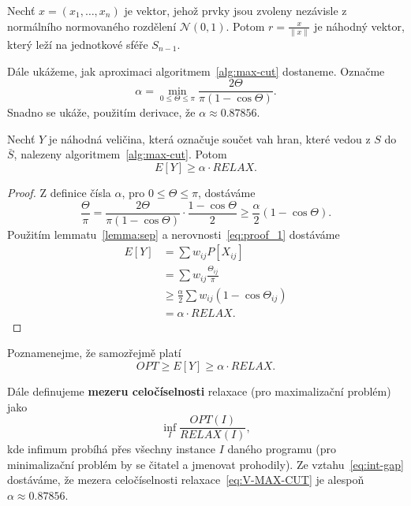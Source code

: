 \begin{lm}[KNUTH 2, 135]
    Nechť $x = (x_1, \dots, x_n)$ je vektor, jehož prvky jsou zvoleny nezávisle z normálního normovaného rozdělení $\mathcal{N}(0,1)$. Potom $r = \frac{x}{\| x \|}$ je náhodný vektor, který leží na jednotkové sféře $S_{n-1}$.
\end{lm}

Dále ukážeme, jak  aproximaci algoritmem~\ref{alg:max-cut} dostaneme. Označme
$$
    \alpha = \min_{0 \leq \Theta \leq \pi} \frac{2 \Theta}{\pi (1 - \cos \Theta)}.
$$
Snadno se ukáže, použitím derivace, že $\alpha \approx 0.87856$.

\begin{lm}
    Nechť $Y$ je náhodná veličina, která označuje součet vah hran, které vedou z $S$ do $\bar{S}$, nalezeny algoritmem~\ref{alg:max-cut}. Potom
    $$
        E\left[ Y \right] \geq \alpha \cdot RELAX.
    $$
\end{lm}

\begin{proof}
    Z definice čísla $\alpha$, pro $0 \leq \Theta \leq \pi$, dostáváme
    \begin{equation}
        \frac{\Theta}{\pi} = \frac{2 \Theta}{\pi (1 - \cos \Theta)} \cdot \frac{1 - \cos \Theta}{2} \geq \frac{\alpha}{2} (1 - \cos \Theta).
        \label{eq:proof_1}
    \end{equation}
    Použitím lemmatu~\ref{lemma:sep} a nerovnosti~\ref{eq:proof_1} dostáváme
    \begin{equation*}
        \begin{split}
            E\left[ Y \right] &= \sum w_{ij} P\left[ X_{ij} \right] \\
                              &= \sum w_{ij} \frac{\Theta_{ij}}{\pi} \\
                              &\geq \frac{\alpha}{2} \sum w_{ij} (1 - \cos \Theta_{ij}) \\
                              &= \alpha \cdot RELAX.
        \end{split}
    \end{equation*}
\end{proof}

\noindent Poznamenejme, že samozřejmě platí
\begin{equation}
    OPT \geq E\left[ Y \right] \geq \alpha \cdot RELAX.
    \label{eq:int-gap}
\end{equation}

\noindent Dále definujeme \textbf{mezeru celočíselnosti} relaxace (pro maximalizační problém) jako
$$
    \inf_{I} \frac{OPT(I)}{RELAX(I)},
$$
kde infimum probíhá přes všechny instance $I$ daného programu (pro minimalizační problém by se čitatel a jmenovat prohodily). Ze vztahu~\ref{eq:int-gap} dostáváme, že mezera celočíselnosti relaxace~\ref{eq:V-MAX-CUT} je alespoň $\alpha \approx 0.87856$.

